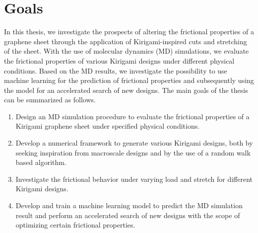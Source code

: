 \section{Goals}\label{sec:goals}
In this thesis, we investigate the prospects of altering the frictional
properties of a graphene sheet through the application of Kirigami-inspired cuts and stretching of the sheet. With the use of molecular dynamics (\acrshort{MD}) simulations, we evaluate the frictional properties of various Kirigami designs under different physical conditions. Based on the \acrshort{MD} results, we investigate the possibility to use machine learning for the prediction of frictional properties and subsequently using the model for an accelerated search of new designs. The main goals of the thesis can be summarized as follows.
\begin{enumerate} 
    \item Design an \acrshort{MD} simulation procedure to evaluate the frictional properties of a Kirigami graphene sheet under specified physical conditions.
    \item Develop a numerical framework to generate various Kirigami designs, both by seeking inspiration from macroscale designs and by the use of a random walk based algorithm.
    \item Investigate the frictional behavior under varying load and stretch for different Kirigami designs.
    \item Develop and train a machine learning model to predict the \acrshort{MD} simulation result and perform an accelerated search of new designs with the scope of optimizing certain frictional properties.
\end{enumerate}





